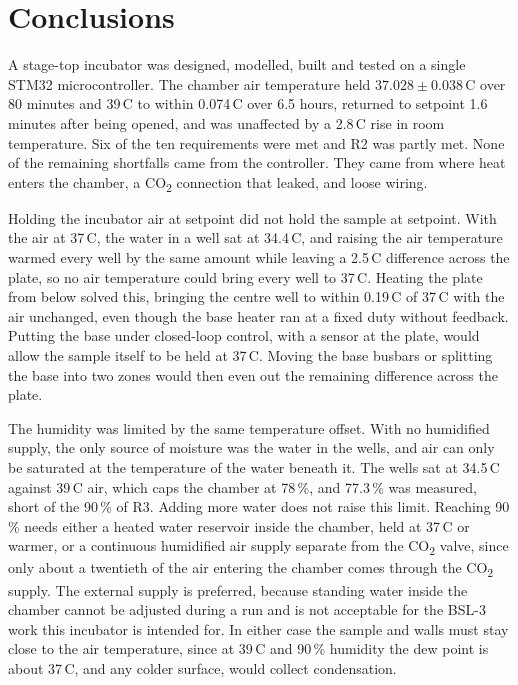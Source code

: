 \chapter{Conclusions}
\label{ch:conclusions}

A stage-top incubator was designed, modelled, built and tested on a single STM32 microcontroller. The chamber air temperature held $37.028 \pm 0.038$\,\textdegree{}C over 80 minutes and 39\,\textdegree{}C to within 0.074\,\textdegree{}C over 6.5 hours, returned to setpoint 1.6 minutes after being opened, and was unaffected by a 2.8\,\textdegree{}C rise in room temperature. Six of the ten requirements were met and R2 was partly met. None of the remaining shortfalls came from the controller. They came from where heat enters the chamber, a CO\textsubscript{2} connection that leaked, and loose wiring.

Holding the incubator air at setpoint did not hold the sample at setpoint. With the air at 37\,\textdegree{}C, the water in a well sat at 34.4\,\textdegree{}C, and raising the air temperature warmed every well by the same amount while leaving a 2.5\,\textdegree{}C difference across the plate, so no air temperature could bring every well to 37\,\textdegree{}C. Heating the plate from below solved this, bringing the centre well to within 0.19\,\textdegree{}C of 37\,\textdegree{}C with the air unchanged, even though the base heater ran at a fixed duty without feedback. Putting the base under closed-loop control, with a sensor at the plate, would allow the sample itself to be held at 37\,\textdegree{}C. Moving the base busbars or splitting the base into two zones would then even out the remaining difference across the plate.


The humidity was limited by the same temperature offset. With no humidified supply, the only source of moisture was the water in the wells, and air can only be saturated at the temperature of the water beneath it. The wells sat at 34.5\,\textdegree{}C against 39\,\textdegree{}C air, which caps the chamber at 78\,\%, and 77.3\,\% was measured, short of the 90\,\% of R3. Adding more water does not raise this limit. Reaching 90\,\% needs either a heated water reservoir inside the chamber, held at 37\,\textdegree{}C or warmer, or a continuous humidified air supply separate from the CO\textsubscript{2} valve, since only about a twentieth of the air entering the chamber comes through the CO\textsubscript{2} supply. The external supply is preferred, because standing water inside the chamber cannot be adjusted during a run and is not acceptable for the BSL-3 work this incubator is intended for. In either case the sample and walls must stay close to the air temperature, since at 39\,\textdegree{}C and 90\,\% humidity the dew point is about 37\,\textdegree{}C, and any colder surface, would collect condensation.

